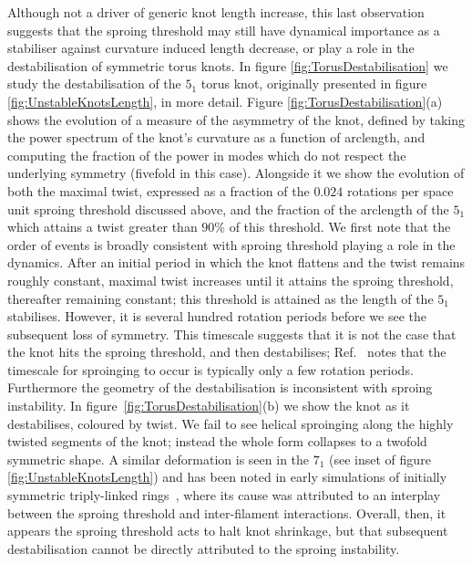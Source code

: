 Although not a driver of generic knot length increase, this last observation suggests that the sproing threshold may still have dynamical importance as a stabiliser against curvature induced length decrease, or play a role in the destabilisation of symmetric torus knots. In figure \ref{fig:TorusDestabilisation} we study the destabilisation of the $5_1$ torus knot, originally presented in figure \ref{fig:UnstableKnotsLength}, in more detail. Figure \ref{fig:TorusDestabilisation}(a) shows the evolution of a measure of the asymmetry of the knot, defined by taking the power spectrum of the knot's curvature as a function of arclength, and computing the fraction of the power in modes which do not respect the underlying symmetry (fivefold in this case). Alongside it we show the evolution of both the maximal twist, expressed as a fraction of the $0.024$ rotations per space unit sproing threshold discussed above, and the fraction of the arclength of the $5_1$ which attains a twist greater than $90\%$ of this threshold. We first note that the order of events is broadly consistent with sproing threshold playing a role in the dynamics. After an initial period in which the knot flattens and the twist remains roughly constant, maximal twist increases until it attains the sproing threshold, thereafter remaining constant; this threshold is attained as the length of the $5_1$ stabilises. However, it is several hundred rotation periods before we see the subsequent loss of symmetry. This timescale suggests that it is not the case that the knot hits the sproing threshold, and then destabilises; Ref.~\citep{Henze1993} notes that the timescale for sproinging to occur is typically only a few rotation periods. Furthermore the geometry of the destabilisation is inconsistent with sproing instability. In figure~\ref{fig:TorusDestabilisation}(b) we show the knot as it destabilises, coloured by twist. We fail to see helical sproinging along the highly twisted segments of the knot; instead the whole form collapses to a twofold symmetric shape. A similar deformation is seen in the $7_1$ (see inset of figure \ref{fig:UnstableKnotsLength}) and has been noted in early simulations of initially symmetric triply-linked rings~\citep{Henze1993}, where its cause was attributed to an interplay between the sproing threshold and inter-filament interactions. Overall, then, it appears the sproing threshold acts to halt knot shrinkage, but that subsequent destabilisation cannot be directly attributed to the sproing instability. 

